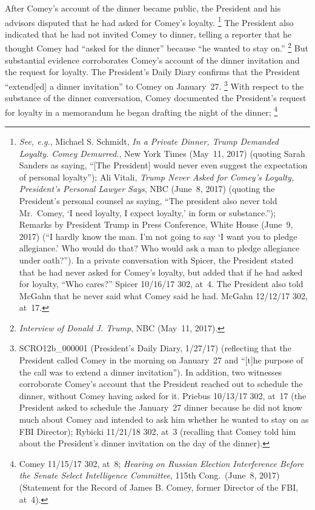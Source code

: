 After Comey's account of the dinner became public, the President and his advisors disputed that he had asked for Comey's loyalty.%
\footnote{\textit{See, e.g.}, Michael S. Schmidt, \textit{In a Private Dinner, Trump Demanded Loyalty. Comey Demurred.}, New York Times (May~11, 2017) (quoting Sarah Sanders as saying, ``[The President] would never even suggest the expectation of personal loyalty'');
Ali Vitali, \textit{Trump Never Asked for Comey's Loyalty, President's Personal Lawyer Says}, NBC (June~8, 2017) (quoting the President's personal counsel as saying, ``The president also never told Mr.~Comey, `I need loyalty, I expect loyalty,' in form or substance.'');
Remarks by President Trump in Press Conference, White House (June~9, 2017) (``I hardly know the man.
I'm not going to say `I want you to pledge allegiance.'
Who would do that?
Who would ask a man to pledge allegiance under oath?'').
In a private conversation with Spicer, the President stated that he had never asked for Comey's loyalty, but added that if he had asked for loyalty, ``Who cares?'' Spicer 10/16/17 302, at~4.
The President also told McGahn that he never said what Comey said he had. McGahn 12/12/17 302, at~17.}
The President also indicated that he had not invited Comey to dinner, telling a reporter that he thought Comey had ``asked for the dinner'' because ``he wanted to stay on.''%
\footnote{\textit{Interview of Donald J. Trump}, NBC (May~11, 2017).}
But substantial evidence corroborates Comey's account of the dinner invitation and the request for loyalty.
The President's Daily Diary confirms that the President ``extend[ed] a dinner invitation'' to Comey on January~27.%
\footnote{SCRO12b\_000001 (President's Daily Diary, 1/27/17) (reflecting that the President called Comey in the morning on January~27 and ``[t]he purpose of the call was to extend a dinner invitation'').
In addition, two witnesses corroborate Comey's account that the President reached out to schedule the dinner, without Comey having asked for it.
Priebus 10/13/17 302, at~17 (the President asked to schedule the January~27 dinner because he did not know much about Comey and intended to ask him whether he wanted to stay on as FBI Director);
Rybicki 11/21/18 302, at~3 (recalling that Comey told him about the President's dinner invitation on the day of the dinner).}
With respect to the substance of the dinner conversation, Comey documented the President's request for loyalty in a memorandum he began drafting the night of the dinner;%
\footnote{Comey 11/15/17 302, at~8;
\textit{Hearing on Russian Election Interference Before the Senate Select Intelligence Committee}, 115th Cong.\ (June~8, 2017) (Statement for the Record of James B. Comey, former Director of the FBI, at~4).}
